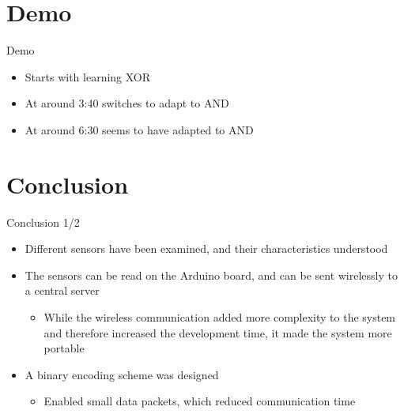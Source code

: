 \section{Demo}
\begin{frame}{Demo}
	\begin{itemize}
		\item Starts with learning XOR
		\item At around 3:40 switches to adapt to AND
		\item At around 6:30 seems to have adapted to AND
	\end{itemize}
\end{frame}

\section{Conclusion}
\begin{frame}{Conclusion 1/2}
	\begin{itemize}
    \item Different sensors have been examined, and their characteristics understood
    \item The sensors can be read on the Arduino board, and can be sent wirelessly to a central server
      \begin{itemize}
        \item While the wireless communication added more complexity to the system and therefore increased the development time, it made the system more portable
      \end{itemize}
    \item A binary encoding scheme was designed
      \begin{itemize}
        \item Enabled small data packets, which reduced communication time
      \end{itemize}
  \end{itemize}
\end{frame}

